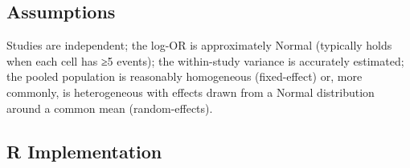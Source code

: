 \documentclass[
]{article}
\begin{document}
\subsection{Assumptions}\label{assumptions}

Studies are independent; the log-OR is approximately Normal (typically
holds when each cell has ≥5 events); the within-study variance is
accurately estimated; the pooled population is reasonably homogeneous
(fixed-effect) or, more commonly, is heterogeneous with effects drawn
from a Normal distribution around a common mean (random-effects).

\subsection{R Implementation}\label{r-implementation}
\end{document}
